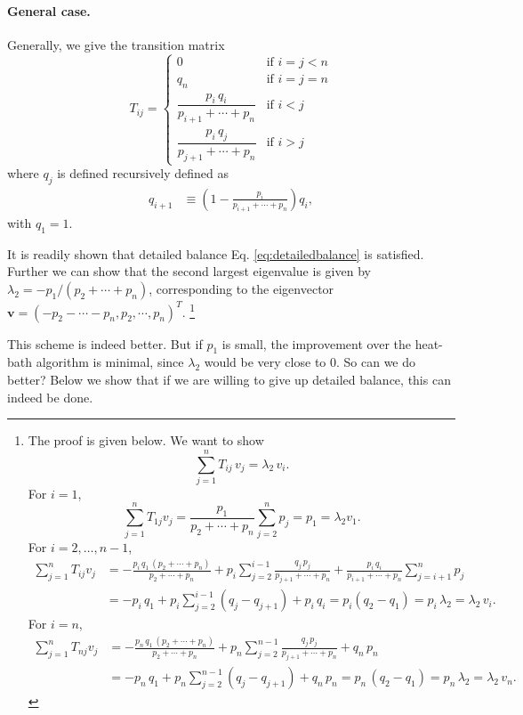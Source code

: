 \documentclass[12pt]{article}
\begin{document}
\paragraph{General case.}

Generally, we give the transition matrix
$$
T_{ij} =
\begin{cases}
  0 & \mbox{if $i = j < n$} \\
  q_n & \mbox{if $i = j = n$} \\
  \dfrac{p_i \, q_i } { p_{i+1} + \cdots + p_n} & \mbox{if $i < j$} \\
  \dfrac{p_i \, q_j}{p_{j+1} + \cdots + p_n} & \mbox{if $i > j$}
\end{cases}
$$
where $q_j$ is defined recursively defined as
$$
\begin{aligned}
  q_{i+1} &\equiv \left(1 - \frac{p_i}{p_{i+1} + \cdots + p_n} \right) q_i,
\end{aligned}
$$
with $q_1 = 1$.

It is readily shown that detailed balance Eq. \eqref{eq:detailedbalance} is satisfied.
Further we can show that the second largest eigenvalue
is given by $\lambda_2 = -p_1/(p_2 + \cdots + p_n)$,
corresponding to the eigenvector
$\mathbf v = (-p_2 - \cdots - p_n, p_2, \cdots, p_n)^T$.
\footnote{
The proof is given below. We want to show
$$
\sum_{j = 1}^n T_{ij} \, v_j = \lambda_2 \, v_i.
$$
For $i = 1$,
$$
\sum_{j=1}^n T_{1j} v_j =
\frac{ p_1 } { p_2 + \cdots + p_n } \sum_{j=2}^n p_j
= p_1
= \lambda_2 v_1.
$$
For $i = 2, \dots, n-1$,
$$
\begin{aligned}
\sum_{j=1}^n T_{ij} v_j
&=
-\frac{ p_i \, q_1 \, (p_2 + \cdots + p_n) } { p_{2} + \cdots + p_n }
+p_i \sum_{j = 2}^{i-1} \frac{ q_j \, p_j } { p_{j+1} + \cdots + p_n }
+\frac{ p_i \, q_i } { p_{i+1} + \cdots + p_n } \sum_{j=i+1}^n p_j \\
&=
-p_i \, q_1
+ p_i \sum_{j = 2}^{i-1} (q_j - q_{j+1})
+p_i \, q_i
=p_i (q_2 - q_1) = p_i \, \lambda_2 = \lambda_2 \, v_i.
\end{aligned}
$$
For $i = n$,
$$
\begin{aligned}
\sum_{j=1}^n T_{nj} v_j
&=
-\frac{ p_n \, q_1 \, (p_2 + \cdots + p_n) } { p_{2} + \cdots + p_n }
+p_n \sum_{j = 2}^{n-1} \frac{ q_j \, p_j } { p_{j+1} + \cdots + p_n }
+q_n \, p_n \\
&=
-p_n \, q_1
+p_n \sum_{j = 2}^{n-1} (q_j - q_{j+1})
+q_n \, p_n
=p_n \, (q_2 - q_1) = p_n \, \lambda_2 = \lambda_2 \, v_n.
\end{aligned}
$$
}

This scheme is indeed better.
But if $p_1$ is small,
the improvement over the heat-bath algorithm is minimal,
since $\lambda_2$ would be very close to $0$.
So can we do better?
%
Below we show that
if we are willing to give up detailed balance,
this can indeed be done.
\end{document}
